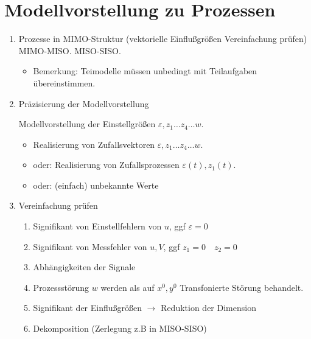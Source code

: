 \documentclass[ngerman]{tudscrreprt}
\begin{document}
	\section{Modellvorstellung zu Prozessen}
	\begin{enumerate}
	\item Prozesse in MIMO-Struktur (vektorielle Einflußgrößen Vereinfachung prüfen)
	\subitem MIMO-MISO.
	\subitem MISO-SISO.
	\begin{itemize}
	\item Bemerkung: Teimodelle müssen unbedingt mit Teilaufgaben übereinstimmen.
	\end{itemize}
	\item Präzisierung der Modellvorstellung \\

		\begin{figure}[H] 
		\centering 
		\def\svgwidth{300pt} 
		 
		\end{figure} 

		Modellvorstellung der Einstellgrößen $\varepsilon, z_1 \dots z_4 \dots w.$
		\begin{itemize}
		\item Realisierung von Zufallsvektoren $\varepsilon, z_1 \dots z_4 \dots w.$
		\item oder: Realisierung von Zufallsprozessen $\varepsilon(t), z_1(t).$ 
		\item oder: (einfach) unbekannte Werte
		\end{itemize}
	\item Vereinfachung prüfen
		\begin{enumerate}
		\item Signifikant von Einstellfehlern von $u$, ggf $\varepsilon=0$
		\item Signifikant von Messfehler von $u,V$, ggf $z_1 =0 \quad z_2 = 0$
		\item Abhängigkeiten der Signale
		\item Prozessstörung $w$ werden als auf $x^0, y^0$ Transfonierte Störung behandelt.

		\begin{figure}[H] 
		\centering 
		\def\svgwidth{200pt} 
		 
		\end{figure} 

		\item Signifikant der Einflußgrößen
		$\rightarrow$ Reduktion der Dimension
		\item Dekomposition (Zerlegung z.B in MISO-SISO)
		\end{enumerate}

	\end{enumerate}
\end{document}
